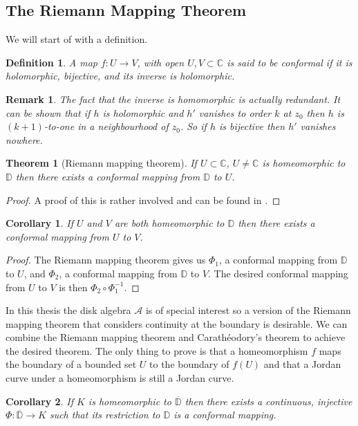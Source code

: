 \documentclass[a4paper,12pt,twoside,BCOR=10mm]{scrbook}
\newtheorem{theorem}{Theorem}
\newtheorem{corollary}{Corollary}
\newtheorem{remark}{Remark}
\newtheorem{definition}{Definition}
\begin{document}
\subsection{The Riemann Mapping Theorem} 
We will start of with a definition. %
\begin{definition}
A map $f: U \rightarrow V$, with open $U, V \subset \mathbb{C}$ is said to be \emph{conformal} if it is holomorphic, bijective, and its inverse is holomorphic.
\end{definition}
\begin{remark}
The fact that the inverse is homomorphic is actually redundant.
It can be shown \cite{green and krantz bls. 165} that if $h$ is holomorphic and $h'$ vanishes to order $k$ at $z_0$ then $h$ is $(k + 1)$-to-one in a neighbourhood of $z_0$.
So if $h$ is bijective then $h'$ vanishes nowhere.
\end{remark}
\begin{theorem}[Riemann mapping theorem]
If $U \subset \mathbb{C}$, $U \neq \mathbb{C}$ is homeomorphic to $\mathbb{D}$ then there exists a conformal mapping from $\mathbb{D}$ to $U$.
\end{theorem}
\begin{proof}
A proof of this is rather involved and can be found in \cite{proof of Riemann mapping theorem}. %
\end{proof}
\begin{corollary}
If $U$ and $V$ are both homeomorphic to $\mathbb{D}$ then there exists a conformal mapping from $U$ to $V$.
\end{corollary}
\begin{proof}
The Riemann mapping theorem gives us $\Phi_1$, a conformal mapping from $\mathbb{D}$ to $U$, and $\Phi_2$, a conformal mapping from $\mathbb{D}$ to $V$.
The desired conformal mapping from $U$ to $V$ is then $\Phi_2 \circ \Phi_1^{-1}$.
\end{proof}
In this thesis the disk algebra $\mathcal{A}$ is of special interest so a version of the Riemann mapping theorem that considers continuity at the boundary is desirable.
We can combine the Riemann mapping theorem and Carathéodory's theorem to achieve the desired theorem.
The only thing to prove is that a homeomorphism $f$ maps the boundary of a bounded set $U$ to the boundary of $f(U)$ and that a Jordan curve under a homeomorphism is still a Jordan curve.
\begin{corollary}
If $K$ is homeomorphic to $\overline{\mathbb{D}}$ then there exists a continuous, injective $\Phi: \overline{\mathbb{D}} \rightarrow K$ such that its restriction to $\mathbb{D}$ is a conformal mapping.
\end{corollary}
\end{document}
